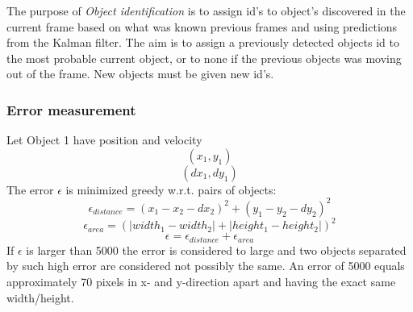 The purpose of \emph{Object identification} is to assign id's to object's discovered in the current frame based on what was known previous frames and using predictions from the Kalman filter. The aim is to assign a previously detected objects id to the most probable current object, or to none if the previous objects was moving out of the frame. New objects must be given new id's. 

\subsubsection{Error measurement}
Let Object 1 have position and velocity
\begin{equation}
(x_1, y_1)
\end{equation}
\begin{equation}
(dx_1, dy_1)
\end{equation}
The error $\epsilon$ is minimized greedy w.r.t. pairs of objects:
\begin{equation}
  \epsilon_{distance} = (x_1 - x_2 - dx_2)^2 + (y_1 - y_2 - dy_2)^2
\end{equation}
\begin{equation}
  \epsilon_{area} = (|width_1 - width_2| + |height_1 - height_2|)^2
\end{equation}
\begin{equation}
  \epsilon = \epsilon_{distance} + \epsilon_{area}
\end{equation}
If $\epsilon$ is larger than 5000 the error is considered to large and two objects separated by such high error are considered not possibly the same. An error of 5000 equals approximately 70 pixels in x- and y-direction apart and having the exact same width/height.

